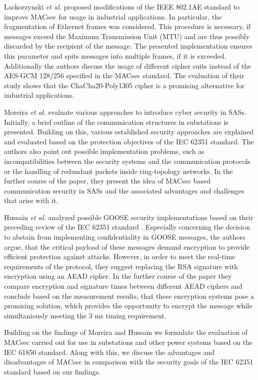 \documentclass[conference]{IEEEtran}
\begin{document}
\smallskip
Lackorzynski \textit{et al.} \cite{MACsecIndustrialOptimization:2020} proposed modifications of the IEEE 802.1AE standard to improve MACsec for usage 
in industrial applications. In particular, the fragmentation of Ethernet frames was considered. This procedure is necessary, if messages exceed the 
Maximum Transmission Unit (MTU) and are thus possibly discarded by the recipient of the message. The presented implementation ensures this parameter 
and spits messages into multiple frames, if it is exceeded. Additionally the authors discuss the usage of different cipher suits instead of the 
AES-GCM 128/256 specified in the MACsec standard. The evaluation of their study shows that the ChaCha20-Poly1305 cipher is a promising alternative 
for industrial applications.

\smallskip
Moreira  \textit{et al.} \cite{Cybersecurity_Substation:2016} evaluate various approaches to introduce cyber security in SASs. Initially, a brief outline 
of the communication structures in substations is presented. Building on this, various established security approaches are explained and evaluated based 
on the protection objectives of the IEC 62351 standard. The authors also point out possible implementation problems, such as incompatibilities between 
the security systems and the communication protocols or the handling of redundant packets inside ring-topology networks. In the further course of the 
paper, they present the idea of MACsec based communication security in SASs and the associated advantages and challenges that arise with it. 

\smallskip
Hussain \textit{et al.} \cite{GOOSE_confidentiality_integrity:2020} analyzed possible GOOSE security implementations based on their preceding review 
of the IEC 62351 standard \cite{Review_IEC62351:2019}. Especially concerning the decision to abstain from implementing confidentiality in GOOSE messages, 
the authors argue, that the critical payload of these messages demand encryption to provide efficient protection against attacks. However, in order to 
meet the real-time requirements of the protocol, they suggest replacing the RSA signature with encryption using an AEAD cipher. In the further course 
of the paper they compare encryption and signature times between different AEAD ciphers and conclude based on the measurement results, that these encryption 
systems pose a promising solution, which provides the opportunity to encrypt the message while simultaniously  meeting the 3 ms timing requirement.

\smallskip 
Building on the findings of Moreira \cite{Cybersecurity_Substation:2016} and Hussain \cite{GOOSE_confidentiality_integrity:2020}\cite{Review_IEC62351:2019} 
we formulate the evaluation of MACsec carried out for use in substations and other power systems based on the IEC 61850 standard. Along with this, we 
discuss the advantages and disadvantages of MACsec in comparison with the security goals of the IEC 62351 standard based on our findings. 
\end{document}
